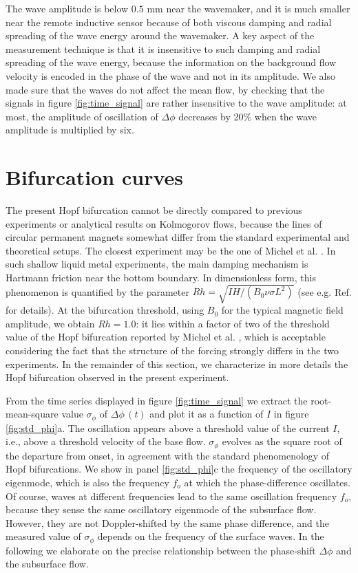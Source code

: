 \documentclass[doublecol]{epl2} %
\begin{document}
The wave amplitude is below $0.5$ mm  near the wavemaker, and it is much smaller near the remote inductive sensor because of both viscous damping and radial spreading of the wave energy around the wavemaker. A key aspect of the measurement technique is that it is insensitive to such damping and radial spreading of the wave energy, because the information on the background flow velocity is encoded in the phase of the wave and not in its amplitude.
We also made sure that the waves do not affect the mean flow, by checking that the signals in figure \ref{fig:time_signal} are rather insensitive to the wave amplitude: at most, the amplitude of oscillation of $\Delta \phi$ decreases by 20\% when the wave amplitude is multiplied by six.

\section{Bifurcation curves}
The present Hopf bifurcation cannot be directly compared to previous experiments or analytical results on Kolmogorov flows, because the lines of circular permanent magnets somewhat differ from the standard experimental and theoretical setups. The closest experiment may be the one of Michel et al. \cite{Michel}. In such shallow liquid metal experiments, the main damping mechanism is Hartmann friction near the bottom boundary. In dimensionless form, this phenomenon is quantified by the parameter $Rh=\sqrt{I H /(B_0 \nu \sigma L^2)}$ (see e.g. Ref. \cite{Sommeria} for details). At the bifurcation threshold, using $B_0$ for the typical magnetic field amplitude, we obtain $Rh=1.0$: it lies within a factor of two of the threshold value of the Hopf bifurcation reported by Michel et al. \cite{Michel}, which is acceptable considering the fact that the structure of the forcing strongly differs in the two experiments. In the remainder of this section, we characterize in more details the Hopf bifurcation observed in the present experiment.

From the time series displayed in figure \ref{fig:time_signal} we extract the root-mean-square value $\sigma_\phi$ of $\Delta \phi \, (t)$ and plot it as a function of $I$ in figure \ref{fig:std_phi}a. The oscillation appears above a threshold value of the current $I$, i.e., above a threshold velocity of the base flow. $\sigma_\phi$ evolves as the square root of the departure from onset, in agreement with the standard phenomenology of Hopf bifurcations. We show in panel \ref{fig:std_phi}c the frequency of the oscillatory eigenmode, which is also the frequency $f_o$ at which the phase-difference oscillates. Of course, waves at different frequencies lead to the same oscillation frequency $f_o$, because they sense the same oscillatory eigenmode of the subsurface flow. However, they are not Doppler-shifted by the same phase difference, and the measured value of $\sigma_\phi$ depends on the frequency of the surface waves. In the following we elaborate on the precise relationship between the phase-shift $\Delta \phi$ and the subsurface flow.
\end{document}
